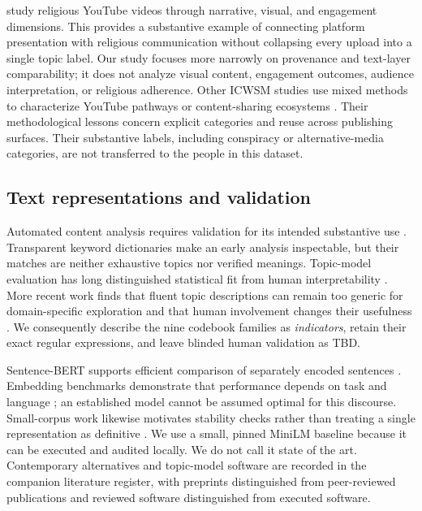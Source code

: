 \citet{chen2026digital} study religious YouTube videos through narrative, visual, and engagement dimensions. This provides a substantive example of connecting platform presentation with religious communication without collapsing every upload into a single topic label. Our study focuses more narrowly on provenance and text-layer comparability; it does not analyze visual content, engagement outcomes, audience interpretation, or religious adherence. Other ICWSM studies use mixed methods to characterize YouTube pathways or content-sharing ecosystems \citep{ota2025pathways,starbird2018ecosystem}. Their methodological lessons concern explicit categories and reuse across publishing surfaces. Their substantive labels, including conspiracy or alternative-media categories, are not transferred to the people in this dataset.

\subsection{Text representations and validation}
Automated content analysis requires validation for its intended substantive use \citep{grimmer2013text}. Transparent keyword dictionaries make an early analysis inspectable, but their matches are neither exhaustive topics nor verified meanings. Topic-model evaluation has long distinguished statistical fit from human interpretability \citep{chang2009reading}. More recent work finds that fluent topic descriptions can remain too generic for domain-specific exploration and that human involvement changes their usefulness \citep{li2025haystack}. We consequently describe the nine codebook families as \emph{indicators}, retain their exact regular expressions, and leave blinded human validation as TBD.

Sentence-BERT supports efficient comparison of separately encoded sentences \citep{reimers2019sentencebert}. Embedding benchmarks demonstrate that performance depends on task and language \citep{muennighoff2023mteb,enevoldsen2025mmteb}; an established model cannot be assumed optimal for this discourse. Small-corpus work likewise motivates stability checks rather than treating a single representation as definitive \citep{bloem2019consistency}. We use a small, pinned MiniLM baseline because it can be executed and audited locally. We do not call it state of the art. Contemporary alternatives and topic-model software are recorded in the companion literature register, with preprints distinguished from peer-reviewed publications and reviewed software distinguished from executed software.

